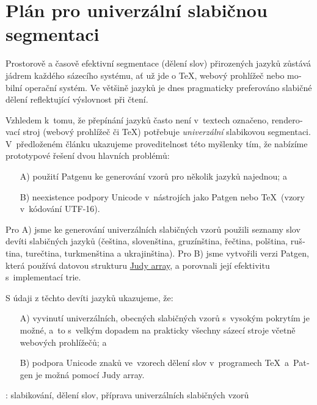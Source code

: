 \documentclass{csbulletin}
\let\program=\textrm %
\newcommand{\Patgen}{\program{Patgen}\xspace}
\begin{document}
\section*{Plán pro univerzální slabičnou segmentaci}
\begin{otherlanguage}{czech}
Prostorově a časově efektivní segmentace (dělení slov) přirozených jazyků zůstává jádrem každého sázecího systému, ať už jde o \TeX, webový prohlížeč nebo mobilní operační systém.
Ve většině jazyků je dnes pragmaticky preferováno slabičné dělení reflektující výslovnost při čtení.

Vzhledem k~tomu, že přepínání jazyků často není v~textech označeno, renderovací stroj (webový prohlížeč či \TeX) potřebuje \emph{univerzální} slabikovou segmentaci.
V~předloženém článku ukazujeme proveditelnost této myšlenky tím, že nabízíme prototypové řešení dvou hlavních problémů:
\begin{enumerate}[leftmargin=.525cm]
     \item[A)] použití \Patgen{}u ke generování vzorů pro několik jazyků najednou; a
     \item[B)] neexistence podpory Unicode v~nástrojích jako \Patgen{} nebo \TeX\ (vzory v~kódování \mbox{UTF-16}).
\end{enumerate}

Pro A) jsme ke generování univerzálních slabičných vzorů použili seznamy slov devíti slabičných jazyků
(čeština, slovenština, gruzínština, řečtina, polština, ruština, turečtina, turkmenština a ukrajinština).
Pro B) jsme vytvořili verzi \Patgen, která používá datovou strukturu
\href{https://en.wikipedia.org/wiki/Judy_array}{Judy array}, a porovnali její efektivitu s~implementací trie.

S údaji z těchto devíti jazyků ukazujeme, že:
\begin{enumerate}[leftmargin=.525cm]
     \item[A)] vyvinutí univerzálních, obecných slabičných vzorů s~vysokým pokrytím je
     možné, a~to s~velkým dopadem na prakticky všechny sázecí stroje
     včetně webových prohlížečů; a
   \item[B)] podpora Unicode znaků ve~vzorech dělení slov
     v~programech \TeX\ a~\Patgen je možná pomocí Judy array.
\end{enumerate}
\end{otherlanguage}
\klicovaslova: slabikování, dělení slov, příprava univerzálních slabičných vzorů
\end{document}
